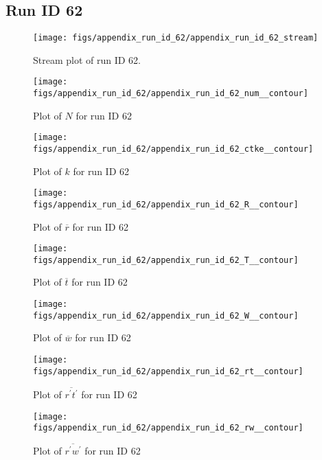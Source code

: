 \subsection{Run ID 62}
\begin{figure}[H]
\centering
\texttt{[image: figs/appendix\_run\_id\_62/appendix\_run\_id\_62\_stream]}
\caption{Stream plot of run ID 62.}
\label{fig:appendix_run_id_62_stream}
\end{figure}


\begin{figure}[H]
\centering
\texttt{[image: figs/appendix\_run\_id\_62/appendix\_run\_id\_62\_num\_\_contour]}
\caption{Plot of $N$ for run ID 62}
\label{fig:appendix_run_id_62_num__contour}
\end{figure}


\begin{figure}[H]
\centering
\texttt{[image: figs/appendix\_run\_id\_62/appendix\_run\_id\_62\_ctke\_\_contour]}
\caption{Plot of $k$ for run ID 62}
\label{fig:appendix_run_id_62_ctke__contour}
\end{figure}


\begin{figure}[H]
\centering
\texttt{[image: figs/appendix\_run\_id\_62/appendix\_run\_id\_62\_R\_\_contour]}
\caption{Plot of $\overline{r}$ for run ID 62}
\label{fig:appendix_run_id_62_R__contour}
\end{figure}


\begin{figure}[H]
\centering
\texttt{[image: figs/appendix\_run\_id\_62/appendix\_run\_id\_62\_T\_\_contour]}
\caption{Plot of $\overline{t}$ for run ID 62}
\label{fig:appendix_run_id_62_T__contour}
\end{figure}


\begin{figure}[H]
\centering
\texttt{[image: figs/appendix\_run\_id\_62/appendix\_run\_id\_62\_W\_\_contour]}
\caption{Plot of $\overline{w}$ for run ID 62}
\label{fig:appendix_run_id_62_W__contour}
\end{figure}


\begin{figure}[H]
\centering
\texttt{[image: figs/appendix\_run\_id\_62/appendix\_run\_id\_62\_rt\_\_contour]}
\caption{Plot of $\overline{r^\prime t^\prime}$ for run ID 62}
\label{fig:appendix_run_id_62_rt__contour}
\end{figure}


\begin{figure}[H]
\centering
\texttt{[image: figs/appendix\_run\_id\_62/appendix\_run\_id\_62\_rw\_\_contour]}
\caption{Plot of $\overline{r^\prime w^\prime}$ for run ID 62}
\label{fig:appendix_run_id_62_rw__contour}
\end{figure}


